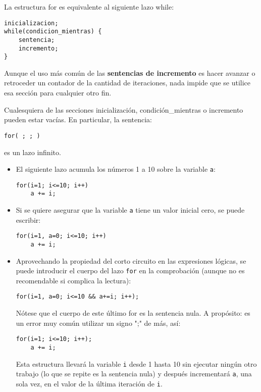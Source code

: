 La estructura for es equivalente al siguiente lazo while:
\begin{lstlisting}
inicializacion;
while(condicion_mientras) {
    sentencia;
    incremento;
}
\end{lstlisting}

Aunque el uso más común de las \textbf{sentencias de incremento} es hacer avanzar o retroceder
un contador de la cantidad de iteraciones, nada impide que se utilice esa
sección para cualquier otro fin. 

Cualesquiera de las secciones inicialización, condición\_mientras o incremento
pueden estar vacías. En particular, la sentencia:
\begin{lstlisting}
for( ; ; )
\end{lstlisting}
es un lazo infinito.

\begin{ejemplo}\noindent
\begin{itemize}
	\item El siguiente lazo acumula los números 1 a 10 sobre la variable \texttt{a}:
\begin{lstlisting}
for(i=1; i<=10; i++)
    a += i;
\end{lstlisting}

\item Si se quiere asegurar que la variable \texttt{a} tiene un valor inicial cero, se puede
escribir:
\begin{lstlisting}
for(i=1, a=0; i<=10; i++)
	a += i;
\end{lstlisting}

\item Aprovechando la propiedad del corto circuito en las expresiones lógicas, se
puede introducir el cuerpo del lazo \texttt{for} en la comprobación (aunque no es
recomendable si complica la lectura):

\begin{lstlisting}
for(i=1, a=0; i<=10 && a+=i; i++);
\end{lstlisting}

Nótese que el cuerpo de este último for es la sentencia nula. A propósito: es
un error muy común utilizar un signo ";" de más, así:
\begin{lstlisting}
for(i=1; i<=10; i++);
    a += i;
\end{lstlisting}

Esta estructura llevará la variable \texttt{i} desde 1 hasta 10 sin ejecutar ningún otro
trabajo (lo que se repite es la sentencia nula) y después incrementará \texttt{a}, una
sola vez, en el valor de la última iteración de \texttt{i}.


\end{itemize}
\end{ejemplo}
